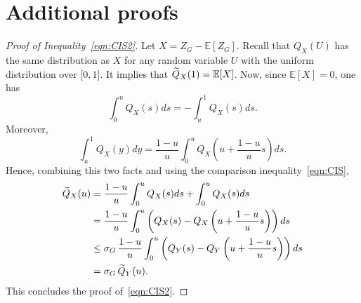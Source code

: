 \documentclass[AHL,Unicode,longabstracts,published]{cedram}
\newcommand{\bE}{\mathbb{E}}
\newcommand{\intervalleff}[2]{\mathopen{[} #1\mathclose{}\mathpunct{},#2\mathclose{]}}
\let\oldtilde\tilde
\renewcommand*{\tilde}[1]{\mathchoice{\widetilde{#1}}{\widetilde{#1}}{\oldtilde{#1}}{\oldtilde{#1}}}
\begin{document}
\appendix
\section{Additional proofs}\label{section:Appendix A}

\begin{proof}[Proof of Inequality~\eqref{eqn:CIS2}]
Let $X=Z_G-\bE[Z_G]$. Recall that $Q_X(U)$ has the same distribution as $X$ for any random variable $U$ with the uniform distribution over $\intervalleff 01$. It implies that $\tilde Q_X(1)=\bE[X]$. Now, since $\bE[X]=0$, one has
\[
\int_0^uQ_X(s)ds=-\int_u^1Q_X(s)ds.
\]
Moreover,
\[
\int_u^1 Q_X(y)dy=\frac{1-u}{u}\int_0^uQ_X\left(u+\frac{1-u}{u}s\right)ds.
\]
Hence, combining this two facts and using the comparison inequality~\eqref{eqn:CIS},
\begin{align*}
\tilde Q_X(u) &=\frac{1-u}{u}\int_0^uQ_X(s)ds+\int_0^uQ_X(s)ds\\
&=\frac{1-u}{u}\int_0^u \left(Q_X(s)-Q_X\left(u+\frac{1-u}{u}s\right)\right)ds\\
&\leq \sigma_G\,\frac{1-u}{u}\int_0^u \left(Q_Y(s)-Q_Y\left(u+\frac{1-u}{u}s\right)\right)ds\\
&= \sigma_G\,\tilde Q_Y(u).
\end{align*}
This concludes the proof of~\eqref{eqn:CIS2}.
\end{proof}
\end{document}
